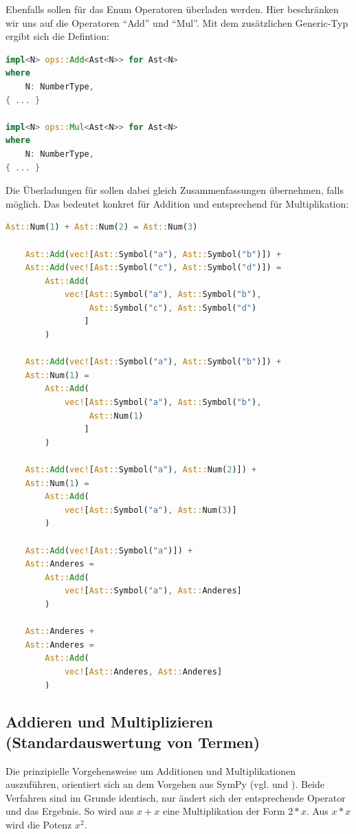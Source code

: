 \documentclass[11pt,a4paper, ngerman]{article}
\begin{document}
Ebenfalls sollen für das Enum  Operatoren überladen werden. Hier beschränken wir uns auf die Operatoren ``Add'' und ``Mul''. Mit dem zusätzlichen Generic-Typ ergibt sich die Defintion:

\begin{lstlisting}[language=rust, caption={Ast Operatorenüberladung}]
impl<N> ops::Add<Ast<N>> for Ast<N>
where
    N: NumberType,
{ ... }

impl<N> ops::Mul<Ast<N>> for Ast<N>
where
    N: NumberType,
{ ... }
\end{lstlisting}

Die Überladungen für  sollen dabei gleich Zusammenfassungen übernehmen, falls möglich. Das bedeutet konkret für Addition und entsprechend für Multiplikation:

\begin{lstlisting}[language=rust, caption={Operatenüberladung für Addition}]
    Ast::Num(1) + Ast::Num(2) = Ast::Num(3)

    Ast::Add(vec![Ast::Symbol("a"), Ast::Symbol("b")]) +
    Ast::Add(vec![Ast::Symbol("c"), Ast::Symbol("d")]) = 
        Ast::Add(
            vec![Ast::Symbol("a"), Ast::Symbol("b"), 
                 Ast::Symbol("c"), Ast::Symbol("d")
                ]
        )

    Ast::Add(vec![Ast::Symbol("a"), Ast::Symbol("b")]) +
    Ast::Num(1) =
        Ast::Add(
            vec![Ast::Symbol("a"), Ast::Symbol("b"), 
                 Ast::Num(1)
                ]
        )

    Ast::Add(vec![Ast::Symbol("a"), Ast::Num(2)]) +
    Ast::Num(1) =
        Ast::Add(
            vec![Ast::Symbol("a"), Ast::Num(3)]
        )

    Ast::Add(vec![Ast::Symbol("a")]) +
    Ast::Anderes =
        Ast::Add(
            vec![Ast::Symbol("a"), Ast::Anderes]
        )

    Ast::Anderes +
    Ast::Anderes =
        Ast::Add(
            vec![Ast::Anderes, Ast::Anderes]
        )
\end{lstlisting}

\label{sec:kapAddnundMult}
\subsection{Addieren und Multiplizieren (Standardauswertung von Termen)}
Die prinzipielle Vorgehensweise um Additionen und Multiplikationen auszuführen, orientiert sich an dem Vorgehen aus SymPy (vgl. \cite{SymPyAddFlatten} und \cite{SymPyMulFlatten}). Beide Verfahren sind im Grunde identisch, nur ändert sich der entsprechende Operator und das Ergebnis. So wird aus $x+x$ eine Multiplikation der Form $2*x$. Aus $x*x$ wird die Potenz $x^2$. 
\end{document}

